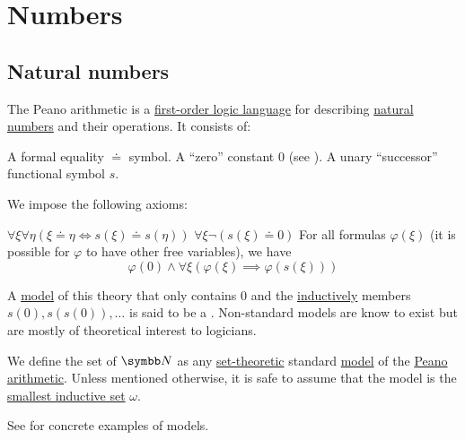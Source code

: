 \section{Numbers}\label{sec:numbers}
\subsection{Natural numbers}\label{subsec:natural_numbers}

\begin{definition}\label{def:peano_arithmetic}
  The Peano arithmetic is a \hyperref[def:first_order_logic_language]{first-order logic language} for describing \hyperref[def:natural_numbers]{natural numbers} and their operations. It consists of:
  \begin{DefEnum}
     A formal equality \( \doteq \) symbol.
     A \enquote{zero} constant \( 0 \) (see ).
     A unary \enquote{successor} functional symbol \( s \).
  \end{DefEnum}

  We impose the following axioms:
  \begin{DefEnum}
     \( \forall \xi \forall \eta (\xi \doteq \eta \iff s(\xi) \doteq s(\eta)) \)
     \( \forall \xi \neg (s(\xi) \doteq 0) \)
     For all formulas \( \varphi(\xi) \) (it is possible for \( \varphi \) to have other free variables), we have
    \begin{equation*}
      \varphi(0) \wedge \forall \xi (\varphi(\xi) \implies \varphi(s(\xi)))
    \end{equation*}
  \end{DefEnum}

  A \hyperref[def:first_order_model]{model} of this theory that only contains \( 0 \) and the \hyperref[remark:induction]{inductively} members \( s(0), s(s(0)), \ldots \) is said to be a . Non-standard models are know to exist but are mostly of theoretical interest to logicians.
\end{definition}

\begin{definition}\label{def:natural_numbers}
  We define the set of  \( \BN \) as any \hyperref[sec:set_theory]{set-theoretic} standard \hyperref[def:first_order_model]{model} of the \hyperref[def:peano_arithmetic]{Peano arithmetic}. Unless mentioned otherwise, it is safe to assume that the model is the \hyperref[ex:natural_numbers_models/omega]{smallest inductive set} \( \omega \).

  See  for concrete examples of models.
\end{definition}

